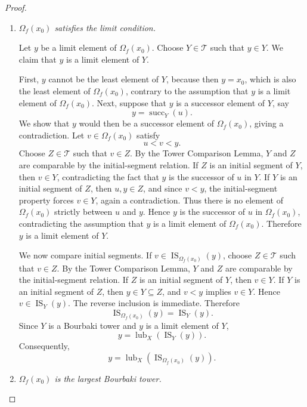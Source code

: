 \documentclass[10pt,a4paper]{amsart}
\newcommand{\IS}{\operatorname{IS}}
\newcommand{\lub}{\operatorname{lub}}
\newcommand{\succop}{\operatorname{succ}}
\begin{document}
\begin{proof}
\begin{enumerate}
Now let \(u\in\Omega_f(x_0)\) satisfy \(y<u\). By the same comparability argument, there
is a tower in \(\mathcal T\) containing both \(y\) and \(u\). In that tower, the least
element strictly above \(y\) is \(f(y)\). Therefore
\[
f(y)\leq u.
\]
Thus \(f(y)\) is the least element of \(\Omega_f(x_0)\) strictly above \(y\). Hence
\[
\succop_{\Omega_f(x_0)}(y)=f(y).
\]

\item \emph{\(\Omega_f(x_0)\) satisfies the limit condition.}

Let \(y\) be a limit element of \(\Omega_f(x_0)\). Choose \(Y\in\mathcal T\) such that
\(y\in Y\). We claim that \(y\) is a limit element of \(Y\).

First, \(y\) cannot be the least element of \(Y\), because then \(y=x_0\), which is also
the least element of \(\Omega_f(x_0)\), contrary to the assumption that \(y\) is a limit
element of \(\Omega_f(x_0)\). Next, suppose that \(y\) is a successor element of \(Y\),
say
\[
y=\succop_Y(u).
\]
We show that \(y\) would then be a successor element of \(\Omega_f(x_0)\), giving a
contradiction. Let \(v\in\Omega_f(x_0)\) satisfy
\[
u<v<y.
\]
Choose \(Z\in\mathcal T\) such that \(v\in Z\). By the Tower Comparison Lemma, \(Y\)
and \(Z\) are comparable by the initial-segment relation. If \(Z\) is an initial segment of
\(Y\), then \(v\in Y\), contradicting the fact that \(y\) is the successor of \(u\) in
\(Y\). If \(Y\) is an initial segment of \(Z\), then \(u,y\in Z\), and since \(v<y\), the
initial-segment property forces \(v\in Y\), again a contradiction. Thus there is no element
of \(\Omega_f(x_0)\) strictly between \(u\) and \(y\). Hence \(y\) is the successor of
\(u\) in \(\Omega_f(x_0)\), contradicting the assumption that \(y\) is a limit element of
\(\Omega_f(x_0)\). Therefore \(y\) is a limit element of \(Y\).

We now compare initial segments. If \(v\in\IS_{\Omega_f(x_0)}(y)\), choose
\(Z\in\mathcal T\) such that \(v\in Z\). By the Tower Comparison Lemma, \(Y\) and \(Z\)
are comparable by the initial-segment relation. If \(Z\) is an initial segment of \(Y\),
then \(v\in Y\). If \(Y\) is an initial segment of \(Z\), then \(y\in Y\subseteq Z\), and
\(v<y\) implies \(v\in Y\). Hence \(v\in\IS_Y(y)\). The reverse inclusion is immediate.
Therefore
\[
\IS_{\Omega_f(x_0)}(y)=\IS_Y(y).
\]
Since \(Y\) is a Bourbaki tower and \(y\) is a limit element of \(Y\),
\[
y=\lub_X(\IS_Y(y)).
\]
Consequently,
\[
y=\lub_X(\IS_{\Omega_f(x_0)}(y)).
\]

\item \emph{\(\Omega_f(x_0)\) is the largest Bourbaki tower.}


\end{enumerate}
\end{proof}
\end{document}
